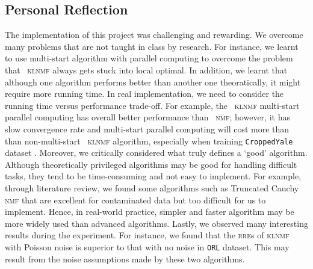 \begin{table}
\caption{Average of evaluations metrics over 10 Monte-Carlo simulations using \texttt{CroppedYale} dataset.}
\centering
{}
\end{table}
\subsection{Personal Reflection}
The implementation of this project was challenging and rewarding. We overcome many problems that are not taught in class by research. For instance, we learnt to use multi-start algorithm with parallel computing to overcome the problem that ~\textsc{klnmf} always gets stuck into local optimal. 
In addition, we learnt that although one algorithm performs better than another one theoratically, it might require more running time. In real implementation, we need to consider the running time versus performance trade-off. For example, the ~\textsc{klnmf}  multi-start parallel computing has overall better performance than ~\textsc{nmf}; however, it has slow convergence rate and multi-start parallel computing will cost more than than non-multi-start ~\textsc{klnmf} algorithm, especially when training \texttt{CroppedYale} dataset .
Moreover, we critically considered what truly defines a `good' algorithm. Although theoretically privileged algorithms may be good for handling difficult tasks, they tend to be time-consuming and not easy to implement. For example, through literature review, we found some algorithms such as Truncated Cauchy \textsc{nmf} \citet{guan2017truncated} that are excellent for contaminated data but too difficult for us to implement. Hence, in real-world practice, simpler and faster algorithm may be more widely used than advanced algorithms. 
Lastly, we observed many interesting results during the experiment. For instance, we found that the \textsc{rre}s of \textsc{klnmf} with Poisson noise is superior to that with no noise in \texttt{ORL} dataset. %
This may result from the noise assumptions made by these two algorithms. 
